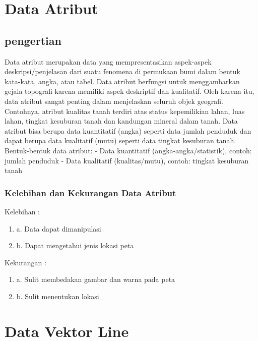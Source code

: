 \section{Data Atribut}
\subsection{pengertian}
Data atribut merupakan data yang mempresentasikan aspek-aspek deskripsi/penjelasan 
dari suatu fenomena di permukaan bumi dalam bentuk kata-kata, angka, atau tabel. 
Data atribut berfungsi untuk menggambarkan gejala topografi karena memiliki aspek deskriptif dan kualitatif. 
Oleh karena itu, data atribut sangat penting dalam menjelaskan seluruh objek geografi. 
Contohnya, atribut kualitas tanah terdiri atas status kepemilikian lahan, luas lahan, 
tingkat kesuburan tanah dan kandungan mineral dalam tanah. 
Data atribut bisa berupa data kuantitatif (angka) seperti data jumlah penduduk dan dapat berupa data kualitatif (mutu) 
seperti data tingkat kesuburan tanah.  
Bentuk-bentuk data atribut:
-	Data kuantitatif (angka-angka/statistik), contoh: jumlah penduduk
-	Data kualitatif (kualitas/mutu), contoh: tingkat kesuburan tanah

\subsubsection{Kelebihan dan Kekurangan Data Atribut}
Kelebihan :
\begin{enumerate}
   \item a. Data dapat dimanipulasi 
   \item b. Dapat mengetahui jenis lokasi peta
\end{enumerate}
Kekurangan :
\begin{enumerate}
   \item a. Sulit membedakan gambar dan warna pada peta
   \item b. Sulit menentukan lokasi
\end{enumerate}

\section{Data Vektor Line}
